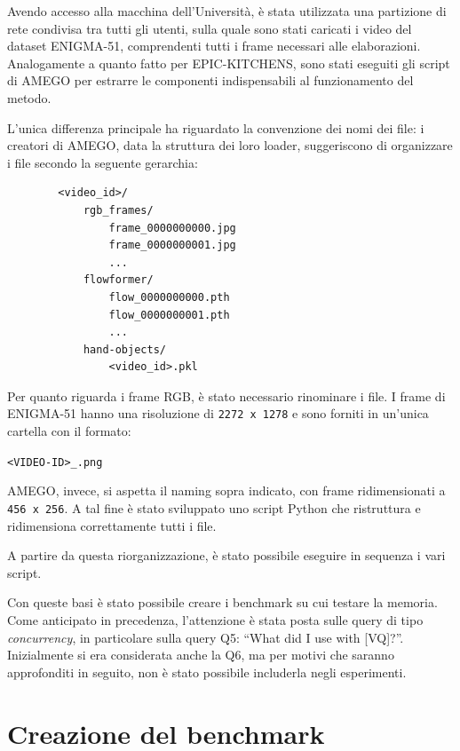 Avendo accesso alla macchina dell'Università, è stata utilizzata una partizione di rete condivisa tra tutti gli utenti, sulla quale sono stati caricati i video del dataset ENIGMA-51, comprendenti tutti i frame necessari alle elaborazioni. Analogamente a quanto fatto per EPIC-KITCHENS, sono stati eseguiti gli script di AMEGO per estrarre le componenti indispensabili al funzionamento del metodo. 

L'unica differenza principale ha riguardato la convenzione dei nomi dei file: i creatori di AMEGO, data la struttura dei loro loader, suggeriscono di organizzare i file secondo la seguente gerarchia:
\begin{center}
    \begin{verbatim}
        <video_id>/
            rgb_frames/
                frame_0000000000.jpg
                frame_0000000001.jpg
                ...
            flowformer/
                flow_0000000000.pth
                flow_0000000001.pth
                ...
            hand-objects/
                <video_id>.pkl
    \end{verbatim}    
\end{center}

Per quanto riguarda i frame RGB, è stato necessario rinominare i file. I frame di ENIGMA-51 hanno una risoluzione di \texttt{2272 x 1278} e sono forniti in un'unica cartella con il formato:
\begin{center}
\texttt{<VIDEO-ID>\_<FRAME-ID>.png}    
\end{center}
AMEGO, invece, si aspetta il naming sopra indicato, con frame ridimensionati a \texttt{456 x 256}. A tal fine è stato sviluppato uno script Python che ristruttura e ridimensiona correttamente tutti i file.

A partire da questa riorganizzazione, è stato possibile eseguire in sequenza i vari script.

Con queste basi è stato possibile creare i benchmark su cui testare la memoria. Come anticipato in precedenza, l'attenzione è stata posta sulle query di tipo \emph{concurrency}, in particolare sulla query Q5: ``What did I use with [VQ]?''. Inizialmente si era considerata anche la Q6, ma per motivi che saranno approfonditi in seguito, non è stato possibile includerla negli esperimenti.

\section{Creazione del benchmark}

